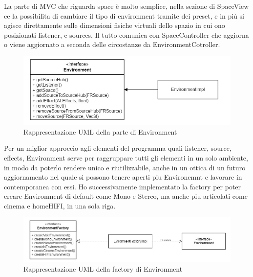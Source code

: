\documentclass[a4paper,12pt]{report}
\begin{document}
La parte di MVC che riguarda space è molto semplice, nella sezione di SpaceView ce la possibilita di cambiare il tipo di environment tramite dei preset, e in più si agisce direttamente sulle dimensioni fisiche virtuali dello spazio in cui ono posizionati listener, e sources. Il tutto comunica con SpaceController che aggiorna o viene aggiornato a seconda delle circostanze da EnvironmentCotroller.
%
\begin{figure}[H]
\centering{}
\includegraphics[width=\textwidth]{img/Environment.png}
\caption{Rappresentazione UML della parte di Environment}
\label{img:evnrionment}
\end{figure}
Per un miglior approccio agli elementi del programma quali listener, source, effects, Environment serve per raggruppare tutti gli elementi in un solo ambiente, in modo da poterlo rendere unico e riutilizzabile, anche in un ottica di un futuro aggiornamento nel quale si possono tenere aperti piu Environemnt e lavorare in contemporanea con essi.
Ho successivamente implementato la factory per poter creare Environment di default come Mono e Stereo, ma anche piu articolati come cinema e homeHIFI, in una sola riga.
%
\begin{figure}[H]
\centering{}
\includegraphics[width=\textwidth]{img/EnvironmentFactory.png}
\caption{Rappresentazione UML della factory di Environment}
\label{img:environmentfactory}
\end{figure}
\end{document}
